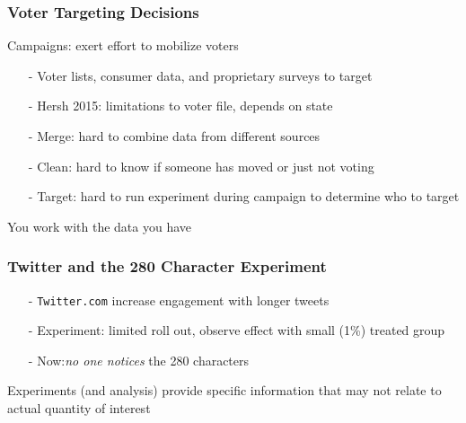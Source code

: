 \documentclass{beamer}
\numberwithin{equation}{section}
\begin{document}
\begin{frame}
\frametitle{Voter Targeting Decisions}

Campaigns: exert effort to mobilize voters
\begin{itemize}
\item[-] Voter lists, consumer data, and proprietary surveys to target
\item[-] Hersh 2015: limitations to voter file, depends on state
\item[-] \alert{Merge}: hard to combine data from different sources
\item[-] \alert{Clean}: hard to know if someone has moved or just not voting
\item[-] \alert{Target}: hard to run experiment during campaign to determine who to target
\end{itemize}  

You work with the data you have 





\end{frame}


 \begin{frame}
 \frametitle{Twitter and the 280 Character Experiment}


 \begin{itemize}
 \item[-] {\tt Twitter.com} increase engagement with longer tweets
 \item[-] \alert{Experiment}: limited roll out, observe effect with small (1\%) treated group
 \item[-] Now:\emph{no one notices} the 280 characters
 \end{itemize}  



 Experiments (and analysis) provide specific information that may not relate to actual quantity of interest




 \end{frame}
\end{document}
